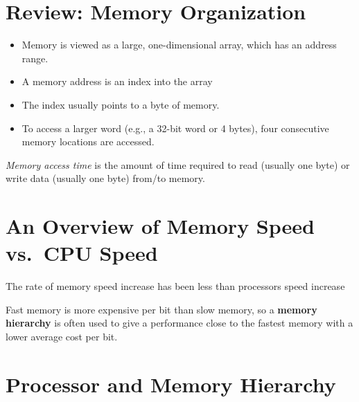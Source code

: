 \documentclass[
  12pt,
  a4paper,
]{report}
\begin{document}
\section{Review: Memory Organization}\label{review-memory-organization}

\begin{itemize}
\item
  Memory is viewed as a large, one-dimensional array, which has an
  address range.
\item
  A memory address is an index into the array
\item
  The index usually points to a byte of memory.
\item
  To access a larger word (e.g., a 32-bit word or 4 bytes), four
  consecutive memory locations are accessed.
\end{itemize}

\emph{Memory access time} is the amount of time required to read
(usually one byte) or write data (usually one byte) from/to memory.

\label{MemVsCPUSpeed}
\section{An Overview of Memory Speed vs.~CPU
Speed}\label{an-overview-of-memory-speed-vs.-cpu-speed}

The rate of memory speed increase has been less than processors speed
increase

Fast memory is more expensive per bit than slow memory, so a
\textbf{memory hierarchy} is often used to give a performance close to
the fastest memory with a lower average cost per bit.

\label{ProcessorAndMemoryHierarchy}
\section{Processor and Memory
Hierarchy}\label{processor-and-memory-hierarchy}
\end{document}
